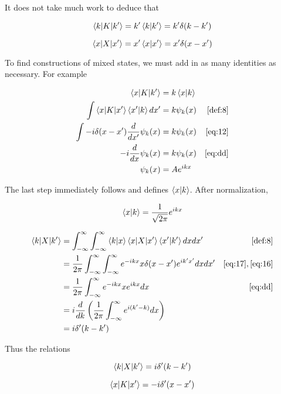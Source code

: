 \documentclass{tufte-book}
\newcommand{\infint}{\int^{\infty}_{-\infty}}
\begin{document}
It does not take much work to deduce that

\begin{equation}
	\label{eq:15}
	\braket{k|K|k'} = k'\braket{k|k'} = k'\delta(k-k')
\end{equation}

\begin{equation}
	\label{eq:16}
	\braket{x|X|x'} = x'\braket{x|x'} = x'\delta(x-x')
\end{equation}

To find constructions of mixed states, we must add in as many identities as necessary. For example

\begin{align*}
	\braket{x|K|k'} &= k\braket{x|k}\\
	\int\braket{x|K|x'}\braket{x'|k}dx' &= k\psi_k(x) & \ref{def:8}\\
	\int -i\delta(x-x')\frac{d}{dx'}\psi_k(x) &= k\psi_k(x) & \ref{eq:12}\\
	-i\frac{d}{dx}\psi_k(x) &= k\psi_k(x) & \ref{eq:dd}\\
	\psi_k(x) &= Ae^{ikx}
\end{align*}

The last step immediately follows and defines $\braket{x|k}$. After normalization,

\begin{equation}
	\label{eq:17}
	\braket{x|k} = \frac{1}{\sqrt{2\pi}}e^{ikx}
\end{equation}

\begin{align*}
	\braket{k|X|k'} &= \infint\infint\braket{k|x}\braket{x|X|x'}\braket{x'|k'}dxdx' & \ref{def:8}\\
	&= \frac{1}{2\pi}\infint\infint e^{-ikx}x\delta(x-x')e^{ik'x'}dxdx' & \ref{eq:17}, \ref{eq:16}\\
	&= \frac{1}{2\pi}\infint e^{-ikx}xe^{ikx}dx & \ref{eq:dd}\\
	&= i\frac{d}{dk}\left(\frac{1}{2\pi}\infint e^{i(k'-k)}dx\right) \\
	&= i\delta'(k-k')
\end{align*}

Thus the relations

\begin{equation}
	\label{eq:18}
	\braket{k|X|k'} = i\delta'(k-k')
\end{equation}

\begin{equation}
	\label{eq:19}
	\braket{x|K|x'} = -i\delta'(x-x')
\end{equation}
\end{document}

